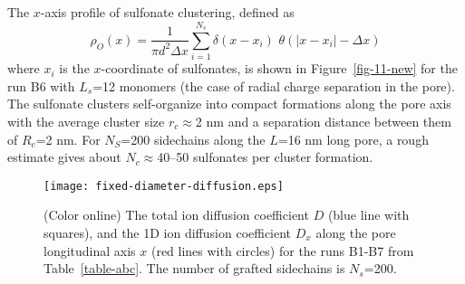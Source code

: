 \documentclass[3p,english,preprint]{elsarticle}
\begin{document}
The $x$-axis profile of sulfonate clustering, defined as 
\begin{equation}
\rho_O(x) = 
\frac{1}{\pi d^2 \Delta x }
\displaystyle\sum\limits_{i=1}^{N_s} \delta{\left( x - x_i \right)} 
\,\, \theta \left( \vert  x -   x_i \vert  - \Delta x\right)
\label{rhox}
\end{equation}
where $x_i$ is the $x$-coordinate of sulfonates, 
is shown in Figure~\ref{fig-11-new} for the run B6 with $L_s$=12 monomers
(the case of  radial charge separation in the pore). The sulfonate clusters 
self-organize   into compact formations along the pore axis
with the  average cluster size $r_c$$\approx$2 nm and a  
separation distance between them of  $R_c$=2 nm.  For $N_S$=200 sidechains along the 
$L$=16 nm long pore, a rough estimate gives about $N_c$$\approx$40--50 
 sulfonates per cluster formation.  



 




\begin{figure}[!ht]
\begin{center}
\texttt{[image: fixed-diameter-diffusion.eps]}
\end{center}
\vspace{-0.7cm}
\caption{(Color online)   
The total ion  diffusion coefficient $D$ 
(blue line with squares), and the 1D ion diffusion 
coefficient $D_x$ along the pore longitudinal axis $x$ 
(red lines with circles)
for  the runs B1-B7 from  Table~\ref{table-abc}. 
The number of grafted sidechains is  $N_s$=200. 
 \label{fig-12-new}}
\end{figure}
\end{document}
